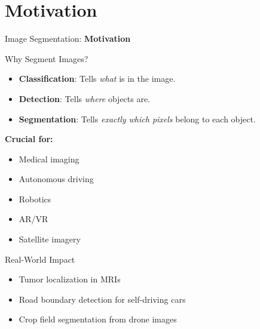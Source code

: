 \section{Motivation}
\begin{frame}{}
    \LARGE Image Segmentation: \textbf{Motivation}
\end{frame}

\begin{frame}{Why Segment Images?}
    \begin{itemize}
        \item \textbf{Classification}: Tells \textit{what} is in the image.
        \item \textbf{Detection}: Tells \textit{where} objects are.
        \item \textbf{Segmentation}: Tells \textit{exactly which pixels} belong to each object.
    \end{itemize}
    \vspace{1em}
    \textbf{Crucial for:}
    \begin{itemize}
        \item Medical imaging
        \item Autonomous driving
        \item Robotics
        \item AR/VR
        \item Satellite imagery
    \end{itemize}
\end{frame}

\begin{frame}{Real-World Impact}
    \begin{itemize}
        \item Tumor localization in MRIs
        \item Road boundary detection for self-driving cars
        \item Crop field segmentation from drone images
    \end{itemize}
\end{frame}